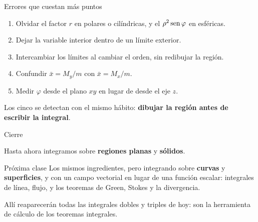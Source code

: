 \documentclass[11pt,aspectratio=169]{beamer}
\begin{document}
\begin{frame}{Errores que cuestan más puntos}
  \begin{enumerate}
    \setlength{\itemsep}{6pt}
    \item Olvidar el factor $r$ en polares o cilíndricas, y el $\rho^2\operatorname{sen}\varphi$ en esféricas.
    \pause
    \item Dejar la variable interior dentro de un límite exterior.
    \pause
    \item Intercambiar los límites al cambiar el orden, sin redibujar la región.
    \pause
    \item Confundir $\bar x=M_y/m$ con $\bar x=M_x/m$.
    \pause
    \item Medir $\varphi$ desde el plano $xy$ en lugar de desde el eje $z$.
  \end{enumerate}
  \vspace{10pt}
  \pause
  \begin{center}\small\color{gray60}
  Los cinco se detectan con el mismo hábito: \textbf{dibujar la región antes de escribir la integral}.
  \end{center}
\end{frame}

\begin{frame}{Cierre}
  \begin{center}
  \normalsize
  Hasta ahora integramos sobre \textbf{regiones planas} y \textbf{sólidos}.
  \end{center}
  \vspace{10pt}
  \pause
  \begin{block}{Próxima clase}
    Los mismos ingredientes, pero integrando sobre \textbf{curvas} y \textbf{superficies}, y con un campo vectorial en lugar de una función escalar: integrales de línea, flujo, y los teoremas de Green, Stokes y la divergencia.
  \end{block}
  \vspace{8pt}
  \pause
  \begin{center}\small\color{gray60}
  Allí reaparecerán todas las integrales dobles y triples de hoy: son la herramienta de cálculo de los teoremas integrales.
  \end{center}
\end{frame}
\end{document}
